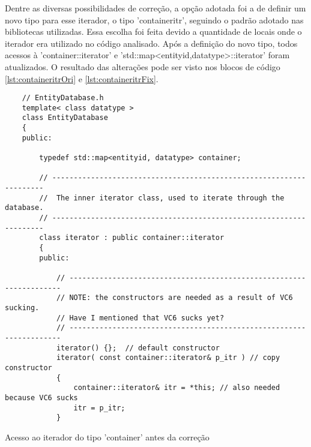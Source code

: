 Dentre as diversas possibilidades de correção, a opção adotada foi a de definir um novo tipo para
esse iterador, o tipo 'containeritr', seguindo o padrão adotado nas bibliotecas utilizadas.
Essa escolha foi feita devido a quantidade de locais onde o iterador era utilizado no código analisado.
Após a definição do novo tipo, todos acessos à 'container::iterator' e  
'std::map<entityid,datatype>::iterator' foram atualizados. O resultado das alterações pode ser visto nos
blocos de código \ref{lst:containeritrOri} e \ref{lst:containeritrFix}.

\begin{listing}[!ht]
    \begin{verbatim}
    // EntityDatabase.h
    template< class datatype >
    class EntityDatabase
    {
    public:

        typedef std::map<entityid, datatype> container;

        // --------------------------------------------------------------------
        //  The inner iterator class, used to iterate through the database.
        // --------------------------------------------------------------------
        class iterator : public container::iterator
        {
        public:

            // --------------------------------------------------------------------
            // NOTE: the constructors are needed as a result of VC6 sucking.
            // Have I mentioned that VC6 sucks yet?
            // --------------------------------------------------------------------
            iterator() {};  // default constructor
            iterator( const container::iterator& p_itr ) // copy constructor
            {
                container::iterator& itr = *this; // also needed because VC6 sucks
                itr = p_itr;
            }
    \end{verbatim}
\caption{Acesso ao iterador do tipo 'container' antes da correção}
\label{lst:containeritrOri}
\end{listing}

